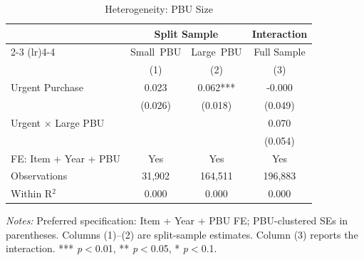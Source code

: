 \begin{table}[ht]
  \centering
  \caption{Heterogeneity: PBU Size}
  \label{tab:het_pbu}
  \small
  \begin{threeparttable}
  \begin{tabular}{lccc}
    \hline\hline
    & \multicolumn{2}{c}{Split Sample} & Interaction \\
    \cmidrule(lr){2-3} \cmidrule(lr){4-4}
    & Small~PBU & Large~PBU & Full Sample \\
    & (1) & (2) & (3) \\
    \hline
    Urgent Purchase & 0.023 & 0.062*** & -0.000 \\
     & (0.026) & (0.018) & (0.049) \\[3pt]
    Urgent × Large PBU &  &  & 0.070 \\
     &  &  & (0.054) \\[3pt]
    \hline
    FE: Item + Year + PBU & Yes & Yes & Yes \\
    Observations & 31,902 & 164,511 & 196,883 \\
    Within R$^2$ & 0.000 & 0.000 & 0.000 \\
    \hline\hline
  \end{tabular}
  \begin{tablenotes}
    \small
    \item \textit{Notes:} Preferred specification: Item + Year + PBU FE; PBU-clustered SEs in parentheses. Columns (1)--(2) are split-sample estimates. Column (3) reports the interaction. *** \textit{p}$<$0.01, ** \textit{p}$<$0.05, * \textit{p}$<$0.1.
  \end{tablenotes}
  \end{threeparttable}
\end{table}
